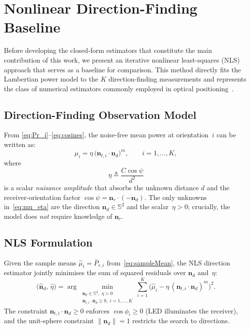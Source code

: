 \documentclass[journal]{IEEEtran}
\begin{document}
\section{Nonlinear Direction-Finding Baseline}
\label{sec:NoLineal}

Before developing the closed-form estimators that constitute the main 
contribution of this work, we present an iterative nonlinear least-squares 
(NLS) approach that serves as a baseline for comparison.  This method 
directly fits the Lambertian power model to the $K$ direction-finding 
measurements and represents the class of numerical estimators commonly 
employed in optical positioning~\cite{Qin2020,Ma2024}.

\subsection{Direction-Finding Observation Model}

From \eqref{eq:Pr_i}--\eqref{eq:cosines}, the noise-free mean power 
at orientation~$i$ can be written as:
\begin{equation}
  \mu_i = \eta\,\bigl(\mathbf{n}_{t,i}\cdot\mathbf{n}_d\bigr)^{m},
  \qquad i=1,\dots,K,
  \label{eq:mu_eta}
\end{equation}
where
\begin{equation}
  \eta \triangleq \frac{C\cos\psi}{d^{2}}
  \label{eq:eta_def}
\end{equation}
is a scalar \emph{nuisance amplitude} that absorbs the unknown distance 
$d$ and the receiver-orientation factor 
$\cos\psi = \mathbf{n}_r\!\cdot\!(-\mathbf{n}_d)$.  
The only unknowns in~\eqref{eq:mu_eta} are the direction 
$\mathbf{n}_d\!\in\!\mathbb{S}^{2}$ and the scalar~$\eta>0$; 
crucially, the model does \emph{not} require knowledge of $\mathbf{n}_r$.

\subsection{NLS Formulation}

Given the sample means $\hat\mu_i = \bar P_{r,i}$ from~\eqref{eq:sampleMean}, 
the NLS direction estimator jointly minimises the sum of squared residuals 
over $\mathbf{n}_d$ and~$\eta$:
\begin{equation}
  \bigl(\hat{\mathbf{n}}_{d},\,\hat\eta\bigr)
  = \arg\min_{\substack{\mathbf{n}_d\in\mathbb{S}^{2},\;\eta>0 \\
                         \mathbf{n}_{t,i}\cdot\mathbf{n}_d\ge0,\;i=1,\dots,K}}
    \sum_{i=1}^{K}
    \bigl(\hat\mu_i - \eta\,(\mathbf{n}_{t,i}\cdot\mathbf{n}_d)^{m}\bigr)^{2}.
  \label{eq:nls_cost}
\end{equation}
The constraint $\mathbf{n}_{t,i}\cdot\mathbf{n}_d\ge0$ enforces 
$\cos\phi_i\ge0$ (LED illuminates the receiver), and the unit-sphere 
constraint $\|\mathbf{n}_d\|=1$ restricts the search to directions.
\end{document}
